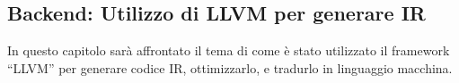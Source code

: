 \subsection{Backend: Utilizzo di LLVM per generare IR}
In questo capitolo sarà affrontato il tema di come è stato utilizzato il framework “LLVM” per 
generare codice IR, ottimizzarlo, e tradurlo in linguaggio macchina.








